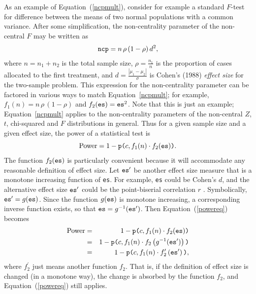 \documentclass[jou]{apa6} %
\newcommand{\R}[1]{\mbox{\texttt{#1}}} %
\begin{document}
As an example of Equation~(\ref{ncpmult}), consider for example a standard $F$-test for difference between the means of two normal populations with a common variance. After some simplification, the non-centrality parameter of the non-central $F$ may be written as
\begin{displaymath}
    \R{ncp} = n \, \rho \, (1-\rho) \, d^2 , 
\end{displaymath}
where $n=n_1+n_2$ is the total sample size, $\rho = \frac{n_1}{n}$ is the proportion of cases allocated to the first treatment, and $d =  \frac{|\mu_1-\mu_2|}{\sigma}$ is Cohen's (1988) \emph{effect size} for the two-sample problem. This expression for the non-centrality parameter can be factored in various ways to match Equation~\ref{ncpmult}; for example, $f_1(n) = n \, \rho \, (1-\rho)$ and $f_2(\R{es}) = \R{es}^2$. Note that this is just an example; Equation~\ref{ncpmult} applies to the non-centrality parameters of the non-central $Z$, $t$, chi-squared and $F$ distributions in general. Thus for a given sample size and a given effect size, the power of a statistical test is
\begin{equation}\label{powereq}
    \mbox{Power} = 1-\R{p(}c,f_1(n)\cdot f_2(\R{es})\R{)}.
\end{equation}
The function $f_2(\R{es})$ is particularly convenient because it will accommodate any reasonable definition of effect size. Let $\R{es}^\prime$ be another effect size measure that is a monotone increasing function of \texttt{es}. For example, \texttt{es} could be Cohen's $d$, and the alternative effect size $\R{es}^\prime$ could be the point-biserial correlation $r$ \parencite[][p. 24]{Cohen1988}. Symbolically, $\R{es}^\prime = g(\R{es})$. Since the function $g(\R{es})$ is monotone increasing, a corresponding inverse function exists, so that $\R{es} = g^{-1}(\R{es}^\prime)$. Then Equation~(\ref{powereq}) becomes
\begin{eqnarray*}
     \mbox{Power} &=& 1-\R{p(}c,f_1(n)\cdot f_2(\R{es})\R{)} \\
                  &=& 1-\R{p(}c,f_1(n)\cdot f_2\left(g^{-1}(\R{es}^\prime)\right)\R{)} \\
                  &=& 1-\R{p(}c,f_1(n)\cdot f_2^\prime\left(\R{es}^\prime\right)\R{)},
\end{eqnarray*}
where $f_2^\prime$ just means another function $f_2$. That is, if the definition of effect size is changed (in a monotone way), the change is absorbed by the function $f_2$, and Equation~(\ref{powereq}) still applies. 
\end{document}
